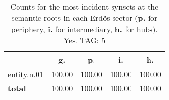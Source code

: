 \begin{table}[h!]
\begin{center}
\begin{tabular}{| l || c | c | c | c |}\hline
 & {\bf g.} & {\bf p.} & {\bf i.} & {\bf h.} \\\hline\hline
entity.n.01 & 100.00  & 100.00  & 100.00  & 100.00 \\\hline\hline
{{\bf total}} & 100.00  & 100.00  & 100.00  & 100.00 \\\hline
\end{tabular}
\caption{Counts for the most incident synsets at the semantic roots in each Erd\"os sector ({\bf p.} for periphery, {\bf i.} for intermediary, {\bf h.} for hubs). Yes. TAG: 5}
\end{center}
\end{table}